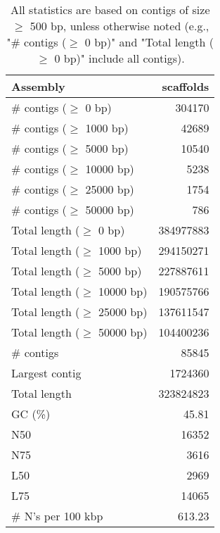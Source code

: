 \documentclass[12pt,a4paper]{article}
\begin{document}
\begin{table}[ht]
\begin{center}
\caption{All statistics are based on contigs of size $\geq$ 500 bp, unless otherwise noted (e.g., "\# contigs ($\geq$ 0 bp)" and "Total length ($\geq$ 0 bp)" include all contigs).}
\begin{tabular}{|l*{1}{|r}|}
\hline
Assembly & scaffolds \\ \hline
\# contigs ($\geq$ 0 bp) & 304170 \\ \hline
\# contigs ($\geq$ 1000 bp) & 42689 \\ \hline
\# contigs ($\geq$ 5000 bp) & 10540 \\ \hline
\# contigs ($\geq$ 10000 bp) & 5238 \\ \hline
\# contigs ($\geq$ 25000 bp) & 1754 \\ \hline
\# contigs ($\geq$ 50000 bp) & 786 \\ \hline
Total length ($\geq$ 0 bp) & 384977883 \\ \hline
Total length ($\geq$ 1000 bp) & 294150271 \\ \hline
Total length ($\geq$ 5000 bp) & 227887611 \\ \hline
Total length ($\geq$ 10000 bp) & 190575766 \\ \hline
Total length ($\geq$ 25000 bp) & 137611547 \\ \hline
Total length ($\geq$ 50000 bp) & 104400236 \\ \hline
\# contigs & 85845 \\ \hline
Largest contig & 1724360 \\ \hline
Total length & 323824823 \\ \hline
GC (\%) & 45.81 \\ \hline
N50 & 16352 \\ \hline
N75 & 3616 \\ \hline
L50 & 2969 \\ \hline
L75 & 14065 \\ \hline
\# N's per 100 kbp & 613.23 \\ \hline
\end{tabular}
\end{center}
\end{table}
\end{document}
